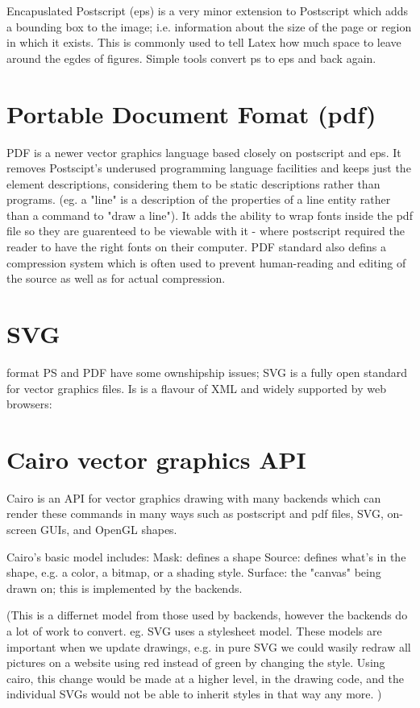 \documentclass[oneside,english]{scrbook}
\begin{document}
Encapuslated Postscript (eps) is a very minor extension to Postscript which adds a bounding box to the image; i.e. information about the size of the page or region in which it exists. This is commonly used to tell Latex how much space to leave around the egdes of figures. Simple tools convert ps to eps and back again.


\section{Portable Document Fomat (pdf)}

PDF is a newer vector graphics language based closely on postscript and eps.  It removes Postscipt's underused programming language facilities and keeps just the element descriptions, considering them to be static descriptions rather than programs.  (eg. a "line" is a description of the properties of a line entity rather than a command to "draw a line").  It adds the ability to wrap fonts inside the pdf file so they are guarenteed to be viewable with it - where postscript required the reader to have the right fonts on their computer.  PDF standard also defins a compression system which is often used to prevent human-reading and editing of the source as well as for actual compression.




\section{SVG} format
PS and PDF have some ownshipship issues; SVG is a fully open standard for vector graphics files. Is is a flavour of XML and widely supported by web browsers:



\section{Cairo vector graphics API}

Cairo is an API for vector graphics drawing with many backends which can render these commands in many ways such as postscript and pdf files, SVG, on-screen GUIs, and OpenGL shapes.

Cairo's basic model includes:
Mask: defines a shape
Source: defines what's in the shape, e.g. a color, a bitmap, or a shading style.
Surface: the "canvas" being drawn on; this is implemented by the backends.

(This is a differnet model from those used by backends, however the backends do a lot of work to convert. eg. SVG uses a stylesheet model.  These models are important when we update drawings, e.g. in pure SVG we could wasily redraw all pictures on a website using red instead of green by changing the style. Using cairo, this change would be made at a higher level, in the drawing code, and the individual SVGs would not be able to inherit styles in that way any more. )
\end{document}
